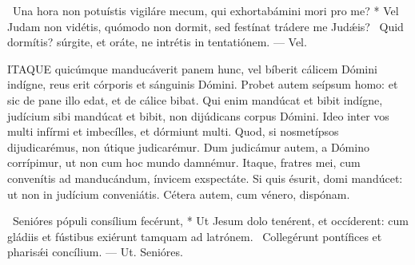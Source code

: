 \R\ Una hora non potuístis vigiláre mecum, qui exhortabámini mori pro me? * Vel Judam non vidétis, quómodo non dormit, sed festínat trádere me Judǽis? \V\ Quid dormítis? súrgite, et oráte, ne intrétis in tentatiónem. --- Vel.


\lettrine[lines=2]{I}{TAQUE} quicúmque manducáverit panem hunc, vel bíberit cálicem Dómini indígne, reus erit córporis et sánguinis Dómini. Probet autem seípsum homo: et sic de pane illo edat, et de cálice bibat. Qui enim mandúcat et bibit indígne, judícium sibi mandúcat et bibit, non dijúdicans corpus Dómini. Ideo inter vos multi infírmi et imbecílles, et dórmiunt multi. Quod, si nosmetípsos dijudicarémus, non útique judicarémur. Dum judicámur autem, a Dómino corrípimur, ut non cum hoc mundo damnémur. Itaque, fratres mei, cum convenítis ad manducándum, ínvicem exspectáte. Si quis ésurit, domi mandúcet: ut non in judícium conveniátis. Cétera autem, cum vénero, dispónam.

\R\ Senióres pópuli consílium fecérunt, * Ut Jesum dolo tenérent, et occíderent: cum gládiis et fústibus exiérunt tamquam ad latrónem. \V\ Collegérunt pontífices et pharisǽi concílium. --- Ut. Senióres.


